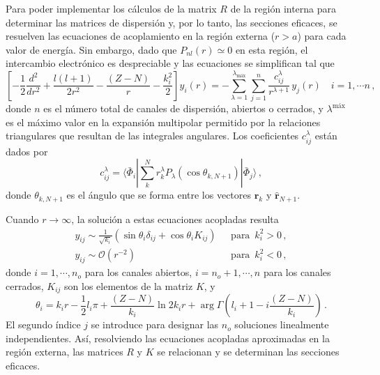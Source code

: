 Para poder implementar los cálculos de la matrix $R$ de la región 
interna para determinar las matrices de dispersión y, por lo tanto, las 
secciones eficaces, se resuelven las ecuaciones de acoplamiento en la 
región externa ($r>a$) para cada valor de energía. Sin embargo, dado 
que $P_{nl}(r)\simeq 0$ en esta región, el intercambio electrónico es
despreciable y las ecuaciones se simplifican tal que
\begin{equation}
\left[-\frac{1}{2}\frac{d^2}{dr^2}+\frac{l(l+1)}{2r^2}-\frac{(Z-N)}{r}
-\frac{k_i^2}{2}\right]y_i(r)=-\sum_{\lambda=1}^{\lambda_{\textrm{máx}}}
\sum_{j=1}^{n}\frac{c_{ij}^{\lambda}}{r^{\lambda+1}}\,y_j(r)
\quad i=1,\cdots n\,,
\label{eq:RM-outer}
\end{equation}
donde $n$ es el número total de canales de dispersión, abiertos o 
cerrados, y $\lambda^{\textrm{máx}}$ es el máximo valor en la expansión
multipolar permitido por la relaciones triangulares que resultan de las 
integrales angulares. Los coeficientes $c_{ij}^{\lambda}$ están dados 
por
\begin{equation}
c_{ij}^{\lambda}=\langle\bar{\Phi}_i\left|\sum_k^Nr_k^{\lambda}
P_{\lambda}\left(\cos\theta_{k,N+1}\right)\right|\bar{\Phi}_j\rangle\,,
\end{equation}
donde $\theta_{k,N+1}$ es el ángulo que se forma entre los vectores 
$\hat{\mathbf{r}}_{k}$ y $\hat{\mathbf{r}}_{N+1}$. 

Cuando $r\rightarrow\infty$, la solución a estas ecuaciones acopladas
resulta
\begin{equation}
\begin{array}{ll}
y_{ij}\sim\frac{1}{\sqrt{k_i}}\left(\sin\theta_i\delta_{ij}+\cos\theta_i
K_{ij}\right) \,\,&\,\,\textrm{para }\,k_i^2>0\,,\\
y_{ij}\sim\mathcal{O}\left(r^{-2}\right) \,\,&\,\,\textrm{para }\,k_i^2<0\,,
\end{array}
\end{equation}
donde $i=1,\cdots,n_o$ para los canales abiertos, $i=n_o+1,\cdots,n$ 
para los canales cerrados, $K_{ij}$ son los elementos de la matriz $K$,
y 
\begin{equation}
\theta_i=k_ir-\frac{1}{2}l_i\pi+\frac{(Z-N)}{k_i}\ln 2k_i r +\arg \Gamma
\left(l_i+1-i\frac{(Z-N)}{k_i}\right)\,.
\end{equation}
El segundo índice $j$ se introduce para designar las $n_o$ soluciones 
linealmente independientes. Así, resolviendo las ecuaciones acopladas
aproximadas en la región externa, las matrices $R$ y $K$ se relacionan 
y se determinan las secciones eficaces.

